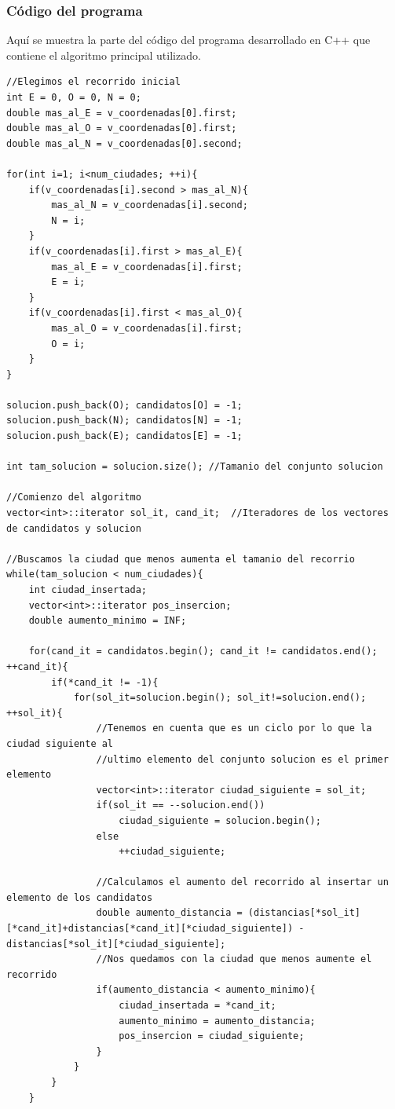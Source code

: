 \documentclass[11pt,a4paper]{article} %
\begin{document}
\subsubsection{Código del programa}
Aquí se muestra la parte del código del programa desarrollado en C++ que contiene el algoritmo principal utilizado.

\begin{lstlisting}[style=C++]
//Elegimos el recorrido inicial
int E = 0, O = 0, N = 0;
double mas_al_E = v_coordenadas[0].first;
double mas_al_O = v_coordenadas[0].first; 
double mas_al_N = v_coordenadas[0].second;

for(int i=1; i<num_ciudades; ++i){
	if(v_coordenadas[i].second > mas_al_N){
		mas_al_N = v_coordenadas[i].second;
		N = i;
	}
	if(v_coordenadas[i].first > mas_al_E){
		mas_al_E = v_coordenadas[i].first;
		E = i;
	}
	if(v_coordenadas[i].first < mas_al_O){
		mas_al_O = v_coordenadas[i].first;
		O = i;
	}
}

solucion.push_back(O); candidatos[O] = -1;
solucion.push_back(N); candidatos[N] = -1;
solucion.push_back(E); candidatos[E] = -1;

int tam_solucion = solucion.size(); //Tamanio del conjunto solucion

//Comienzo del algoritmo
vector<int>::iterator sol_it, cand_it;  //Iteradores de los vectores de candidatos y solucion

//Buscamos la ciudad que menos aumenta el tamanio del recorrio
while(tam_solucion < num_ciudades){
	int ciudad_insertada;
	vector<int>::iterator pos_insercion;
	double aumento_minimo = INF;
	
	for(cand_it = candidatos.begin(); cand_it != candidatos.end(); ++cand_it){
		if(*cand_it != -1){
			for(sol_it=solucion.begin(); sol_it!=solucion.end(); ++sol_it){
				//Tenemos en cuenta que es un ciclo por lo que la ciudad siguiente al
				//ultimo elemento del conjunto solucion es el primer elemento
				vector<int>::iterator ciudad_siguiente = sol_it;
				if(sol_it == --solucion.end())
					ciudad_siguiente = solucion.begin();
				else
					++ciudad_siguiente;
				
				//Calculamos el aumento del recorrido al insertar un elemento de los candidatos
				double aumento_distancia = (distancias[*sol_it][*cand_it]+distancias[*cand_it][*ciudad_siguiente]) - distancias[*sol_it][*ciudad_siguiente];
				//Nos quedamos con la ciudad que menos aumente el recorrido
				if(aumento_distancia < aumento_minimo){
					ciudad_insertada = *cand_it;
					aumento_minimo = aumento_distancia;
					pos_insercion = ciudad_siguiente;
				}
			}  
		}
	}
	

\end{lstlisting}
\end{document}

